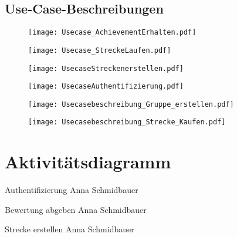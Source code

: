 \documentclass[a4paper, 12pt]{article}
\begin{document}
\subsection{Use-Case-Beschreibungen}

\begin{figure}[H] 
\centering
	   \texttt{[image: Usecase\_AchievementErhalten.pdf]} 
\end{figure}

\begin{figure}[H] 
\centering 
	   \texttt{[image: Usecase\_StreckeLaufen.pdf]} 
\end{figure}

\begin{figure}[H] 
\centering
	   \texttt{[image: UsecaseStreckenerstellen.pdf]} 
\end{figure}

\begin{figure}[H] 
\centering
	   \texttt{[image: UsecaseAuthentifizierung.pdf]} 
\end{figure}

\begin{figure}[H] 
\centering
	   \texttt{[image: Usecasebeschreibung\_Gruppe\_erstellen.pdf]} 
\end{figure}

\begin{figure}[H] 
\centering
	   \texttt{[image: Usecasebeschreibung\_Strecke\_Kaufen.pdf]} 
\end{figure}

\newpage
\section{Aktivitätsdiagramm}

{\Large Authentifizierung}
Anna Schmidbauer
\begin{figure}[H] 
\centering
\end{figure}


{\Large Bewertung abgeben}
Anna Schmidbauer
\begin{figure}[H] 
\centering
\end{figure}
\newpage
{\Large Strecke erstellen}
Anna Schmidbauer
\begin{figure}[H] 
\centering
\end{figure}
\end{document}
